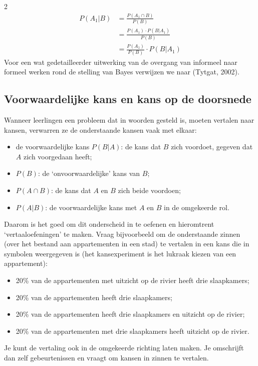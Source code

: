 \begin{multicols} {2}
\begin{equation*}
\begin{split}
P(A_1|B) & =\frac {P(A_1 \cap B)} {P(B)} \\
 & = \frac {P(A_1) \cdot P(B|A_1)} {P(B)} \\
 & = \frac {P(A_1)} {P(B)} \cdot P(B|A_1)
\end{split}
\end{equation*}
Voor een wat gedetailleerder uitwerking van de overgang van informeel naar formeel werken rond de stelling van Bayes verwijzen we naar (Tytgat, 2002).

\subsection*{Voorwaardelijke kans en kans op de doorsnede}

Wanneer leerlingen een probleem dat in woorden gesteld is, moeten vertalen naar kansen, verwarren ze de onderstaande kansen vaak met elkaar:
\begin {itemize}
    \item de voorwaardelijke kans $P(B|A)$: de kans dat $B$ zich voordoet, gegeven dat $A$ zich voorgedaan heeft;
    \item $P(B)$: de ‘onvoorwaardelijke’ kans van $B$;
    \item $P(A \cap B)$: de kans dat $A$ en $B$ zich beide voordoen;
    \item $P(A|B)$: de voorwaardelijke kans met $A$ en $B$ in de omgekeerde rol.
\end{itemize}
Daarom is het goed om dit onderscheid in te oefenen en hieromtrent ‘vertaaloefeningen’ te maken. Vraag bijvoorbeeld om de onderstaande zinnen (over het bestand aan appartementen in een stad) te vertalen in een kans die in symbolen weergegeven is (het kansexperiment is het lukraak kiezen van een appartement):
\begin{itemize}
    \item 20\% van de appartementen met uitzicht op de rivier heeft drie slaapkamers;
    \item 20\% van de appartementen heeft drie slaapkamers;
    \item 20\% van de appartementen heeft drie slaapkamers en uitzicht op de rivier;
    \item 20\% van de appartementen met drie slaapkamers heeft uitzicht op de rivier.
\end{itemize}
Je kunt de vertaling ook in de omgekeerde richting laten maken. Je omschrijft dan zelf gebeurtenissen en vraagt om kansen in zinnen te vertalen.


\end{multicols}
